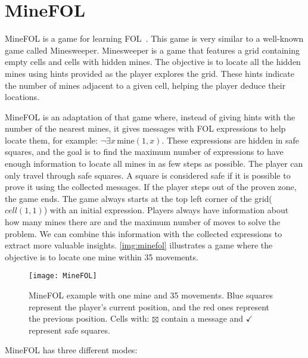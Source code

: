 \section{MineFOL}

MineFOL is a game for learning \gls{FOL}~\cite{groza_minefol}. This game is very similar to a well-known game called Minesweeper. Minesweeper is a game that features a grid containing empty cells and cells with hidden mines. The objective is to locate all the hidden mines using hints provided as the player explores the grid. These hints indicate the number of mines adjacent to a given cell, helping the player deduce their locations. 

MineFOL is an adaptation of that game where, instead of giving hints with the number of the nearest mines, it gives messages with \gls{FOL} expressions to help locate them, for example: \(\neg \exists x \, \text{mine}(1, x)\). These expressions are hidden in safe squares, and the goal is to find the maximum number of expressions to have enough information to locate all mines in as few steps as possible. The player can only travel through safe squares. A square is considered safe if it is possible to prove it using the collected messages. If the player steps out of the proven zone, the game ends. The game always starts at the top left corner of the grid(\(cell(1,1)\)) with an initial expression. Players always have information about how many mines there are and the maximum number of moves to solve the problem. We can combine this information with the collected expressions to extract more valuable insights. \autoref{img:minefol} illustrates a game where the objective is to locate one mine within 35 movements.

\begin{figure}[htbp]
    \centering
    \texttt{[image: MineFOL]}
    \caption{MineFOL example with one mine and 35 movements. Blue squares represent the player's current position, and the red ones represent the previous position. Cells with: \(\boxtimes\) contain a message and \( \checkmark \) represent safe squares.}
    \label{img:minefol}
\end{figure}

MineFOL has three different modes:

